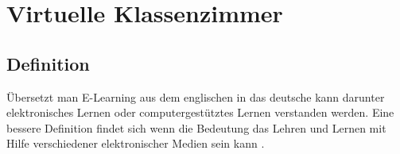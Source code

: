 \chapter{Virtuelle Klassenzimmer}

\section{Definition}
Übersetzt man E-Learning aus dem englischen in das deutsche kann darunter  \glqq elektronisches Lernen\grqq{} oder \glqq computergestütztes Lernen\grqq{} verstanden werden. Eine bessere Definition findet sich wenn die Bedeutung \glqq das Lehren und Lernen mit Hilfe verschiedener elektronischer Medien\grqq{} sein kann \cite[vgl.][]{elearning}.